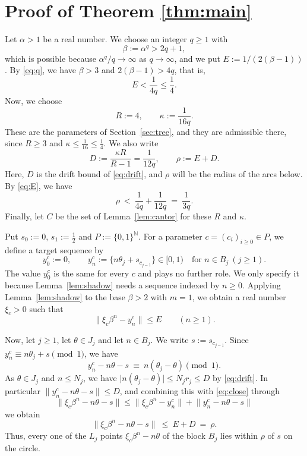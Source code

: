 \documentclass[11pt,reqno]{amsart}
\theoremstyle{definition}
\theoremstyle{remark}
\numberwithin{equation}{section}
\newcommand{\N}{\mathbb{N}}
\begin{document}
\section{Proof of Theorem \ref{thm:main}}\label{sec:proof}

Let $\alpha>1$ be a real number. We choose an integer $q\ge1$ with
\begin{equation}\label{eq:q}
\beta:=\alpha^q>2q+1,
\end{equation}
which is possible because $\alpha^q/q\to\infty$ as $q\to\infty$, and we put $E:=1/(2(\beta-1))$. By \eqref{eq:q}, we have $\beta>3$ and $2(\beta-1)>4q$, that is,
\begin{equation}\label{eq:E}
E<\frac1{4q}\le\frac14 .
\end{equation}
Now, we choose
\begin{equation}\label{eq:param}
R:=4,\qquad \kappa:=\frac1{16q}.
\end{equation}
These are the parameters of Section~\ref{sec:tree}, and they are admissible there, since $R\ge3$ and $\kappa\le\tfrac1{16}\le\tfrac14$. We also write
\[
D:=\frac{\kappa R}{R-1}=\frac1{12q},\qquad \rho:=E+D .
\]
Here, $D$ is the drift bound of \eqref{eq:drift}, and $\rho$ will be the radius of the arcs below. By \eqref{eq:E}, we have
\begin{equation}\label{eq:budget}
\rho\ <\ \frac1{4q}+\frac1{12q}\ =\ \frac1{3q}.
\end{equation}
Finally, let $C$ be the set of Lemma~\ref{lem:cantor} for these $R$ and $\kappa$.

Put $s_0:=0$, $s_1:=\tfrac12$ and $P:=\{0,1\}^{\N}$. For a parameter $c=(c_i)_{i\ge0}\in P$, we define a target sequence by
\[
y^c_0:=0,\qquad y^c_n:=\bigl\{n\theta_j+s_{c_{j-1}}\bigr\}\in[0,1)\quad\text{for }n\in B_j\ (j\ge1).
\]
The value $y^c_0$ is the same for every $c$ and plays no further role. We only specify it because Lemma~\ref{lem:shadow} needs a sequence indexed by $n\ge0$. Applying Lemma~\ref{lem:shadow} to the base $\beta>2$ with $m=1$, we obtain a real number $\xi_c>0$ such that
\begin{equation}\label{eq:close}
\bigl\|\xi_c\beta^n-y^c_n\bigr\|\le E\qquad(n\ge1).
\end{equation}

Now, let $j\ge1$, let $\theta\in J_j$ and let $n\in B_j$. We write $s:=s_{c_{j-1}}$. Since $y^c_n\equiv n\theta_j+s\pmod1$, we have
\[
y^c_n-n\theta-s\ \equiv\ n(\theta_j-\theta)\pmod1 .
\]
As $\theta\in J_j$ and $n\le N_j$, we have $\bigl|n(\theta_j-\theta)\bigr|\le N_jr_j\le D$ by \eqref{eq:drift}. In particular $\bigl\|y^c_n-n\theta-s\bigr\|\le D$, and combining this with \eqref{eq:close} through
\[
\bigl\|\xi_c\beta^n-n\theta-s\bigr\|\le\bigl\|\xi_c\beta^n-y^c_n\bigr\|+\bigl\|y^c_n-n\theta-s\bigr\|
\]
we obtain
\begin{equation}\label{eq:conc}
\bigl\|\xi_c\beta^n-n\theta-s\bigr\|\ \le\ E+D\ =\ \rho .
\end{equation}
Thus, every one of the $L_j$ points $\xi_c\beta^n-n\theta$ of the block $B_j$ lies within $\rho$ of $s$ on the circle.
\end{document}
